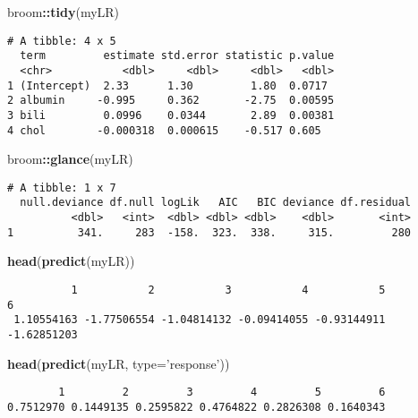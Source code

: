 \documentclass[12pt,letterpaperpaper,openany]{book}
\newenvironment{Shaded}{\begin{snugshade}}{\end{snugshade}}
\newcommand{\DataTypeTok}[1]{\textcolor[rgb]{0.13,0.29,0.53}{#1}}
\newcommand{\KeywordTok}[1]{\textcolor[rgb]{0.13,0.29,0.53}{\textbf{#1}}}
\newcommand{\NormalTok}[1]{#1}
\newcommand{\OperatorTok}[1]{\textcolor[rgb]{0.81,0.36,0.00}{\textbf{#1}}}
\newcommand{\StringTok}[1]{\textcolor[rgb]{0.31,0.60,0.02}{#1}}
\begin{document}
\begin{Shaded}
\begin{Highlighting}[]
\NormalTok{broom}\OperatorTok{::}\KeywordTok{tidy}\NormalTok{(myLR)}
\end{Highlighting}
\end{Shaded}

\begin{verbatim}
# A tibble: 4 x 5
  term         estimate std.error statistic p.value
  <chr>           <dbl>     <dbl>     <dbl>   <dbl>
1 (Intercept)  2.33      1.30         1.80  0.0717 
2 albumin     -0.995     0.362       -2.75  0.00595
3 bili         0.0996    0.0344       2.89  0.00381
4 chol        -0.000318  0.000615    -0.517 0.605  
\end{verbatim}

\begin{Shaded}
\begin{Highlighting}[]
\NormalTok{broom}\OperatorTok{::}\KeywordTok{glance}\NormalTok{(myLR)}
\end{Highlighting}
\end{Shaded}

\begin{verbatim}
# A tibble: 1 x 7
  null.deviance df.null logLik   AIC   BIC deviance df.residual
          <dbl>   <int>  <dbl> <dbl> <dbl>    <dbl>       <int>
1          341.     283  -158.  323.  338.     315.         280
\end{verbatim}

\begin{Shaded}
\begin{Highlighting}[]
\KeywordTok{head}\NormalTok{(}\KeywordTok{predict}\NormalTok{(myLR))}
\end{Highlighting}
\end{Shaded}

\begin{verbatim}
          1           2           3           4           5           6 
 1.10554163 -1.77506554 -1.04814132 -0.09414055 -0.93144911 -1.62851203 
\end{verbatim}

\begin{Shaded}
\begin{Highlighting}[]
\KeywordTok{head}\NormalTok{(}\KeywordTok{predict}\NormalTok{(myLR, }\DataTypeTok{type=}\StringTok{'response'}\NormalTok{))}
\end{Highlighting}
\end{Shaded}

\begin{verbatim}
        1         2         3         4         5         6 
0.7512970 0.1449135 0.2595822 0.4764822 0.2826308 0.1640343 
\end{verbatim}
\end{document}
